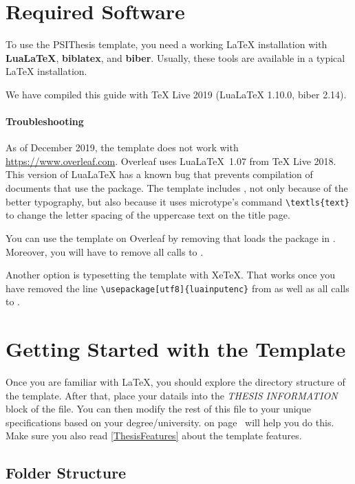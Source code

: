 \section{Required Software}

To use the PSIThesis template, you need a working LaTeX installation with \textbf{LuaLaTeX}, \textbf{biblatex}, and \textbf{biber}. Usually, these tools are available in a typical LaTeX installation.

We have compiled this guide with TeX Live 2019 (LuaLaTeX 1.10.0, biber 2.14).

\paragraph{Troubleshooting}

As of December 2019, the template does not work with \url{https://www.overleaf.com}. Overleaf uses LuaLaTeX~1.07 from TeX Live 2018. This version of LuaLaTeX has a known bug that prevents compilation of documents that use the  package. The template includes , not only because of the better typography, but also because it uses microtype's command \verb|\textls{text}| to change the letter spacing of the uppercase text on the title page.

You can use the template on Overleaf by removing that loads the  package in . Moreover, you will have to remove all calls to .

Another option is typesetting the template with XeTeX. That works once you have removed the line \verb|\usepackage[utf8]{luainputenc}| from  as well as all calls to .


\section{Getting Started with the Template}

Once you are familiar with LaTeX, you should explore the directory structure of the template. After that, place your datails into the \emph{THESIS INFORMATION} block of the  file. You can then modify the rest of this file to your unique specifications based on your degree/university.  on page~\pageref{FillingFile} will help you do this. Make sure you also read \cref{ThesisFeatures} about the template features.


\subsection{Folder Structure}

